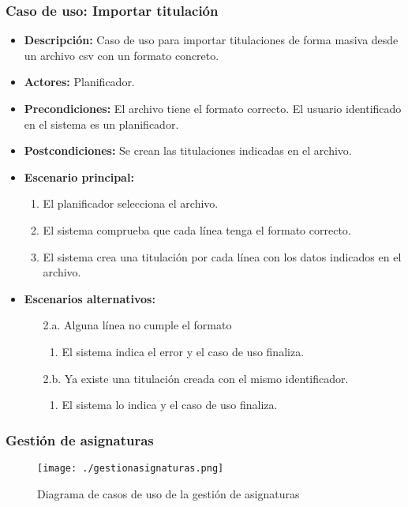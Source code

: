 \subsubsection*{Caso de uso: Importar titulación}
\begin{itemize}
\item{\bf Descripción:} Caso de uso para importar titulaciones de forma masiva desde un archivo csv con un formato concreto.
\item{\bf Actores:} Planificador.
\item{\bf Precondiciones:} El archivo tiene el formato correcto. El usuario identificado en el sistema es un planificador.
\item{\bf Postcondiciones:} Se crean las titulaciones indicadas en el archivo.
\item{\bf Escenario principal:}
	\begin{enumerate}
	\item El planificador selecciona el archivo.
	\item El sistema comprueba que cada línea tenga el formato correcto.
	\item El sistema crea una titulación por cada línea con los datos indicados en el archivo.
	\end{enumerate}
\item{\bf Escenarios alternativos:}
	\begin{itemize}
		\item[2.a.] Alguna línea no cumple el formato
		\begin{enumerate}
			\item El sistema indica el error y el caso de uso finaliza.
		\end{enumerate}
		\item[2.b.] Ya existe una titulación creada con el mismo identificador.
		\begin{enumerate}
			\item El sistema lo indica y el caso de uso finaliza.
		\end{enumerate}
	\end{itemize}
\end{itemize}



\subsubsection{Gestión de asignaturas}
\begin{figure}[H] 
  \label{gestion-asignaturas} 
	\begin{center}
    \texttt{[image: ./gestionasignaturas.png]}
  \end{center}
\caption{Diagrama de casos de uso de la gestión de asignaturas}
\end{figure}
